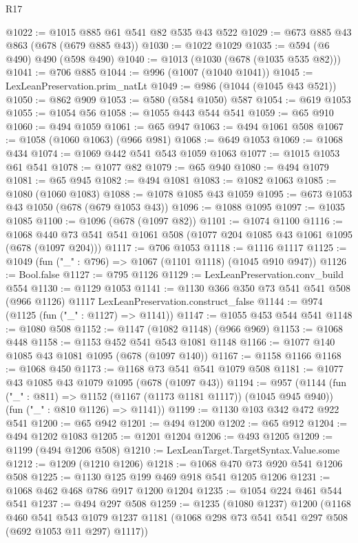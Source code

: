 \begin{lexlean}{R17}
\begin{coremodule}
@1022 := @1015 @885 @61 @541 @82 @535 @43 @522
@1029 := @673 @885 @43 @863 (@678 (@679 @885 @43))
@1030 := @1022 @1029
@1035 := @594 (@6 @490) @490 (@598 @490)
@1040 := @1013 (@1030 (@678 (@1035 @535 @82)))
@1041 := @706 @885
@1044 := @996 (@1007 (@1040 @1041))
@1045 := LexLeanPreservation.prim_natLt
@1049 := @986 (@1044 (@1045 @43 @521))
@1050 := @862 @909
@1053 := @580 (@584 @1050) @587
@1054 := @619 @1053
@1055 := @1054 @56
@1058 := @1055 @443 @544 @541
@1059 := @65 @910
@1060 := @494 @1059
@1061 := @65 @947
@1063 := @494 @1061 @508
@1067 := @1058 (@1060 @1063) (@966 @981)
@1068 := @649 @1053
@1069 := @1068 @434
@1074 := @1069 @442 @541 @543 @1059 @1063
@1077 := @1015 @1053 @61 @541
@1078 := @1077 @82
@1079 := @65 @940
@1080 := @494 @1079
@1081 := @65 @945
@1082 := @494 @1081
@1083 := @1082 @1063
@1085 := @1080 (@1060 @1083)
@1088 := @1078 @1085 @43 @1059
@1095 := @673 @1053 @43 @1050 (@678 (@679 @1053 @43))
@1096 := @1088 @1095
@1097 := @1035 @1085
@1100 := @1096 (@678 (@1097 @82))
@1101 := @1074 @1100
@1116 := @1068 @440 @73 @541 @541 @1061 @508 (@1077 @204 @1085 @43 @1061 @1095 (@678 (@1097 @204)))
@1117 := @706 @1053
@1118 := @1116 @1117
@1125 := @1049 (fun ("_" : @796) => @1067 (@1101 @1118) (@1045 @910 @947))
@1126 := Bool.false
@1127 := @795 @1126
@1129 := LexLeanPreservation.conv_build @554
@1130 := @1129 @1053
@1141 := @1130 @366 @350 @73 @541 @541 @508 (@966 @1126) @1117 LexLeanPreservation.construct_false
@1144 := @974 (@1125 (fun ("_" : @1127) => @1141))
@1147 := @1055 @453 @544 @541
@1148 := @1080 @508
@1152 := @1147 (@1082 @1148) (@966 @969)
@1153 := @1068 @448
@1158 := @1153 @452 @541 @543 @1081 @1148
@1166 := @1077 @140 @1085 @43 @1081 @1095 (@678 (@1097 @140))
@1167 := @1158 @1166
@1168 := @1068 @450
@1173 := @1168 @73 @541 @541 @1079 @508
@1181 := @1077 @43 @1085 @43 @1079 @1095 (@678 (@1097 @43))
@1194 := @957
    (@1144
      (fun ("_" : @811) => @1152 (@1167 (@1173 @1181 @1117)) (@1045 @945 @940))
      (fun ("_" : @810 @1126) => @1141))
@1199 := @1130 @103 @342 @472 @922 @541
@1200 := @65 @942
@1201 := @494 @1200
@1202 := @65 @912
@1204 := @494 @1202 @1083
@1205 := @1201 @1204
@1206 := @493 @1205
@1209 := @1199 (@494 @1206 @508)
@1210 := LexLeanTarget.TargetSyntax.Value.some
@1212 := @1209 (@1210 @1206)
@1218 := @1068 @470 @73 @920 @541 @1206 @508
@1225 := @1130 @125 @199 @469 @918 @541 @1205 @1206
@1231 := @1068 @462 @468 @786 @917 @1200 @1204
@1235 := @1054 @224 @461 @544 @541
@1237 := @494 @297 @508
@1259 := @1235
    (@1080 @1237)
    @1200
    (@1168
      @460
      @541
      @543
      @1079
      @1237
      @1181
      (@1068 @298 @73 @541 @541 @297 @508 (@692 @1053 @11 @297) @1117))

\end{coremodule}
\end{lexlean}
